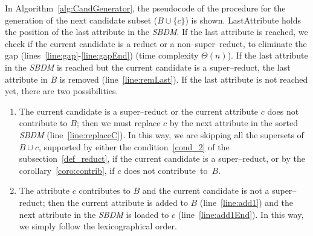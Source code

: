 \documentclass[number,preprint,review,12pt]{elsarticle}
\begin{document}
	In Algorithm~\ref{alg:CandGenerator}, the pseudocode of the procedure for the generation of the next candidate subset ($B\cup \lbrace c\rbrace$) is shown. LastAttribute holds the position of the last attribute in the \textit{SBDM}. If the last attribute is reached, we check if the current candidate is a reduct or a non--super--reduct, to eliminate the gap (lines~\ref{line:gap}-\ref{line:gapEnd}) (time complexity $\Theta(n)$). If the last attribute in the \textit{SBDM} is reached but the current candidate is a super--reduct, the last attribute in $B$ is removed (line~\ref{line:remLast}). If the last attribute is not reached yet, there are two possibilities. 
		
	\begin{enumerate}
		\item The current candidate is a super--reduct or the current attribute $c$ does not contribute to $B$; then we must replace $c$ by the next attribute in the sorted \textit{SBDM} (line~\ref{line:replaceC}). In this way, we are skipping all the supersets of $B\cup{c}$, supported by either the condition~\ref{cond_2} of the subsection~\ref{def_reduct}, if the current candidate is a super--reduct, or by the corollary~\ref{coro:contrib}, if $c$ does not contribute~to~$B$.
		\item The attribute $c$ contributes to $B$ and the current candidate is not a super--reduct; then the current attribute is added to $B$ (line~\ref{line:add1}) and the next attribute in the \textit{SBDM} is loaded to $c$ (line~\ref{line:add1End}). In this way, we simply follow the lexicographical order.
	\end{enumerate}  
	
\end{document}
